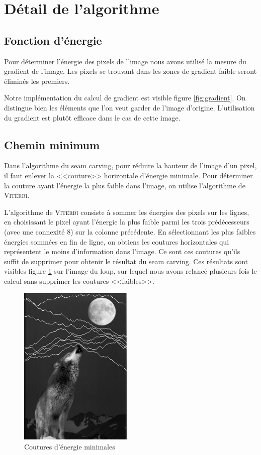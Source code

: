 \documentclass{article}
\begin{document}
\section{Détail de l'algorithme}
\subsection{Fonction d'énergie}
Pour déterminer l'énergie des pixels de l'image nous avons utilisé la mesure du gradient de l'image. Les pixels se
trouvant dans les zones de gradient faible seront éliminés les premiers.

Notre implémentation du calcul de gradient est visible figure \ref{fig:gradient}. On distingue bien les éléments que l'on veut garder de l'image d'origine. L'utilisation du gradient est plutôt efficace dans le cas de cette image.

\subsection{Chemin minimum}
Dans l'algorithme du seam carving, pour réduire la hauteur de l'image d'un pixel, il faut enlever la <<couture>>
horizontale d'énergie minimale.
Pour  déterminer la couture ayant l'énergie la plus faible dans l'image, on utilise l'algorithme de \textsc{Viterbi}.

L'algorithme de \textsc{Viterbi} consiste à sommer les énergies des pixels sur les lignes, en choisissant le pixel ayant
l'énergie la plus faible parmi les trois prédécesseurs (avec une connexité 8) sur la 
colonne précédente. En sélectionnant les plus faibles énergies sommées en fin de ligne, 
on obtiens les coutures horizontales qui représentent le moins d'information dans l'image. 
Ce sont ces coutures qu'ils suffit de supprimer pour obtenir le résultat du seam carving. 
Ces résultats sont visibles figure \ref{seams} sur l'image du loup, sur lequel nous avons 
relancé plusieurs fois le calcul sans supprimer les coutures <<faibles>>.

\begin{figure}[!ht]
    \center
    \includegraphics[width=0.48\textwidth]{img/seams.png}
    \caption{Coutures d'énergie minimales}
    \label{seams}
\end{figure}
\end{document}
